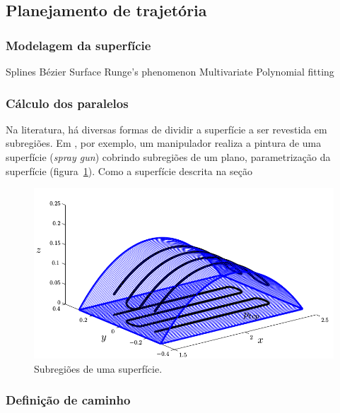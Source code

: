 \subsection{Planejamento de trajetória}

\subsubsection{Modelagem da superfície}\label{}

Splines
Bézier Surface
Runge's phenomenon
Multivariate Polynomial fitting

\subsubsection{Cálculo dos paralelos}
Na literatura, há diversas formas de dividir a superfície a ser revestida em
subregiões. Em \cite{from2010off}, por exemplo, um manipulador realiza a pintura
de uma superfície (\textit{spray gun}) cobrindo  subregiões de um plano, parametrização
da superfície (figura~\ref{fig::pal}). Como a superfície descrita na seção 

\begin{figure}[!ht]
	\centering	
	\includegraphics[width=.5\columnwidth]{figs/planejamento/pal.png}
	\caption{Subregiões de uma superfície.}
	\label{fig::pal}
\end{figure}

\subsubsection{Definição de caminho}
